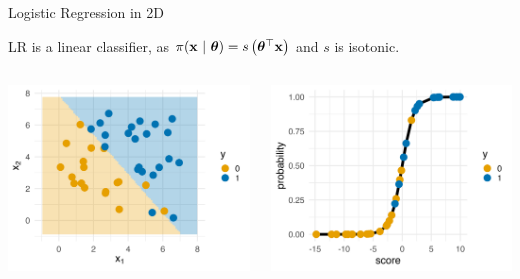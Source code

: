 \documentclass[11pt,compress,t,notes=noshow, xcolor=table]{beamer}
\begin{document}
\begin{vbframe}{Logistic Regression in 2D}

LR is a linear classifier, as $\pi(\mathbf{x}~|~ \bm{\theta}) = s\left( \bm{\theta}^\top \mathbf{x} \right)$ 
and $s$ is isotonic.

\lz\lz

\begin{columns}[T]
\begin{column}{0.5\textwidth}
  \includegraphics[width=\textwidth]{figure/log_reg-db.png}
\end{column}
\begin{column}{0.5\textwidth}
  \includegraphics[width=\textwidth]{figure/log_reg-scores.png}
\end{column}
\end{columns}

\end{vbframe}
\end{document}
